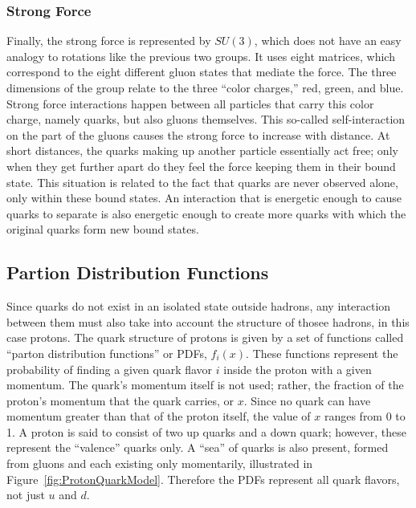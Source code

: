 \subsubsection{Strong Force}
Finally, the strong force is represented by $SU(3)$, 
which does not have an easy analogy to rotations 
like the previous two groups.  
It uses eight matrices, which correspond to the 
eight different gluon states that mediate the force.  
The three dimensions of the group relate to the 
three ``color charges,'' red, green, and blue.  
Strong force interactions happen between all particles 
that carry this color charge, 
namely quarks, but also gluons themselves.  
This so-called self-interaction on the part of the gluons 
causes the strong force to increase with distance.  
At short distances, the quarks making up another particle 
essentially act free; 
only when they get further apart do they feel the force 
keeping them in their bound state.  
This situation is related to the fact that quarks are 
never observed alone, only within these bound states.  
An interaction that is energetic enough to cause 
quarks to separate is also energetic enough to 
create more quarks with which the original quarks 
form new bound states.  


\subsection{Partion Distribution Functions}
\label{theory:pdf}

Since quarks do not exist in an isolated state 
outside hadrons, 
any interaction between them must also take 
into account the structure of thosee hadrons, 
in this case protons.  
The quark structure of protons is given 
by a set of functions called 
``parton distribution functions'' or PDFs, 
$f_i(x)$. 
These functions represent the probability 
of finding a given quark flavor $i$ inside 
the proton with a given momentum.  
The quark's momentum itself is not used; 
rather, the fraction of the proton's 
momentum that the quark carries, or $x$. 
Since no quark can have momentum greater 
than that of the proton itself, 
the value of $x$ ranges from 0 to 1.  
A proton is said to consist of two up quarks 
and a down quark; 
however, these represent the ``valence'' quarks only.  
A ``sea'' of quarks is also present, 
formed from gluons and each existing only 
momentarily, 
illustrated in Figure~\ref{fig:ProtonQuarkModel}.  
Therefore the PDFs represent all quark 
flavors, not just $u$ and $d$.  

